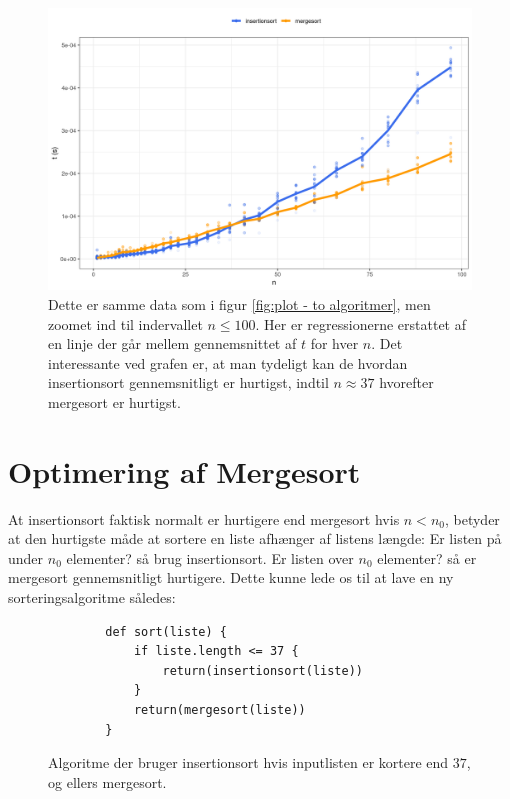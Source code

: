 \begin{figure}
	\begin{center}
		\includegraphics[scale=0.6]{../img/toAlgoritmerZoomedGns.png}
	\end{center}
	\caption{Dette er samme data som i figur \ref{fig:plot - to algoritmer}, men zoomet ind til indervallet $n \leq 100$. Her er regressionerne erstattet af en linje der går mellem gennemsnittet af $t$ for hver $n$. Det interessante ved grafen er, at man tydeligt kan de hvordan insertionsort gennemsnitligt er hurtigst, indtil $n \approx 37$ hvorefter mergesort er hurtigst.}
	\label{fig:toAlgoritmerZoomedGns}
\end{figure}

\section{Optimering af Mergesort}%
\label{sub:Optimering af Mergesort}

At insertionsort faktisk normalt er hurtigere end mergesort hvis $n < n_0$, betyder at den hurtigste måde at sortere en liste afhænger af listens længde: Er listen på under $n_0$ elementer? så brug insertionsort. Er listen over $n_0$ elementer? så er mergesort gennemsnitligt hurtigere. Dette kunne lede os til at lave en ny sorteringsalgoritme således:

\begin{figure}[h]
	\begin{center}
		\begin{lstlisting}
		def sort(liste) {
			if liste.length <= 37 {
				return(insertionsort(liste))
			}
			return(mergesort(liste))
		}
		\end{lstlisting}
	\end{center}
	\vspace{-6mm}
	\caption{Algoritme der bruger insertionsort hvis inputlisten er kortere end $37$, og ellers mergesort.}
	\label{fig:hybridalgoritme}
\end{figure}


